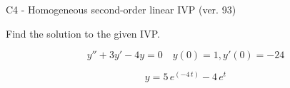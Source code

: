\begin{exercise}
  \begin{exerciseTitle}C4 - Homogeneous second-order linear IVP (ver. 93)\end{exerciseTitle}
  \begin{exerciseStatement}
    
Find the solution to the given IVP.

    
\[y''+3y'-4y = 0 \hspace{1em} y(0) = 1 , y'(0) = -24\]

  \end{exerciseStatement}
  \begin{exerciseAnswer}
    
\[y= 5 \, e^{\left(-4 \, t\right)} - 4 \, e^{t}\]

  \end{exerciseAnswer}
\end{exercise}